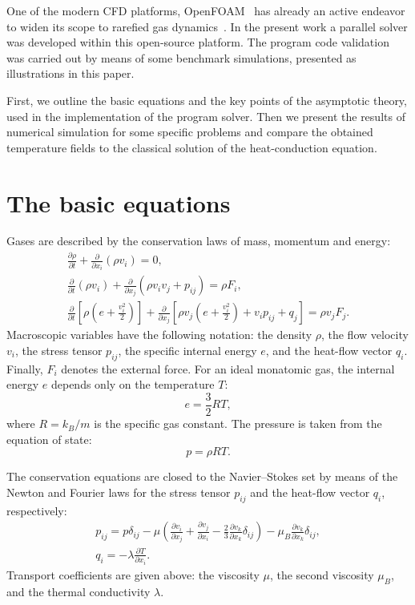 \documentclass[smallextended, referee]{svjour3} %
\newcommand{\pder}[2][]{\frac{\partial#1}{\partial#2}}
\begin{document}
One of the modern CFD platforms, OpenFOAM\textregistered{}~\cite{OpenFOAM1998, OpenFOAM2010} has
already an active endeavor to widen its scope to rarefied gas dynamics~\cite{Pantazis2012}.
In the present work a parallel solver was developed within this open-source platform.
The program code validation was carried out by means of some benchmark simulations,
presented as illustrations in this paper.

First, we outline the basic equations and the key points of the asymptotic theory,
used in the implementation of the program solver.
Then we present the results of numerical simulation for some specific problems
and compare the obtained temperature fields to the classical solution
of the heat-conduction equation.

\section{The basic equations}

Gases are described by the conservation laws of mass, momentum and energy:
\begin{gather}
	\pder[\rho]{t} + \pder{x_i}(\rho v_i) = 0, \label{eq:mass}\\
	\pder{t}(\rho v_i) + \pder{x_j}(\rho v_i v_j + p_{ij}) = \rho F_i, \label{eq:momentum}\\
	\pder{t}\left[\rho\left(e+\frac{v_i^2}2\right)\right] +
		\pder{x_j}\left[\rho v_j\left(e+\frac{v_i^2}2\right)+v_i p_{ij}+q_j\right] = \rho v_j F_j. \label{eq:energy}
\end{gather}
Macroscopic variables have the following notation: the density \(\rho\), the flow velocity \(v_i\), the stress tensor \(p_{ij}\),
the specific internal energy \(e\), and the heat-flow vector \(q_i\). Finally, \(F_i\) denotes the external force.
For an ideal monatomic gas, the internal energy \(e\) depends only on the temperature \(T\):
\[ e = \frac32RT, \]
where \(R = k_B / m\) is the specific gas constant. The pressure is taken from the equation of state:
\[ p = \rho RT. \]

The conservation equations are closed to the Navier--Stokes set by means of the Newton and Fourier laws
for the stress tensor \(p_{ij}\) and the heat-flow vector \(q_i\), respectively:
\begin{gather}
	p_{ij} = p\delta_{ij} - \mu\left(\pder[v_i]{x_j}+\pder[v_j]{x_i}-\frac23\pder[v_k]{x_k}\delta_{ij}\right) -
		\mu_B\pder[v_k]{x_k}\delta_{ij}, \label{eq:stress_tensor}\\
	q_i = -\lambda\pder[T]{x_i}. \label{eq:heat_flow}
\end{gather}
Transport coefficients are given above:
the viscosity \(\mu\), the second viscosity \(\mu_B\), and the thermal conductivity \(\lambda\).
\end{document}

